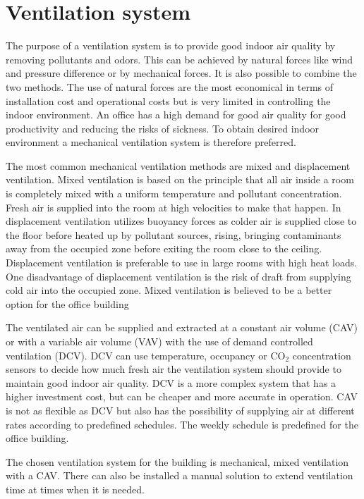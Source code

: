 \section{Ventilation system}
The purpose of a ventilation system is to provide good indoor air quality by removing pollutants and odors. This can be achieved by natural forces like wind and pressure difference or by mechanical forces. It is also possible to combine the two methods. The use of natural forces are the most economical in terms of installation cost and operational costs but is very limited in controlling the indoor environment. An office has a high demand for good air quality for good productivity and reducing the risks of sickness. To obtain desired indoor environment a mechanical ventilation system is therefore preferred.

The most common mechanical ventilation methods are mixed and displacement ventilation. Mixed ventilation is based on the principle that all air inside a room is completely mixed with a uniform temperature and pollutant concentration. Fresh air is supplied into the room at high velocities to make that happen. In displacement ventilation utilizes buoyancy forces as colder air is supplied close to the floor before heated up by pollutant sources, rising, bringing contaminants away from the occupied zone before exiting the room close to the ceiling. Displacement ventilation is preferable to use in large rooms with high heat loads. One disadvantage of displacement ventilation is the risk of draft from supplying cold air into the occupied zone. Mixed ventilation is believed to be a better option for the office building

The ventilated air can be supplied and extracted at a constant air volume (\ac{CAV}) or with a variable air volume (\ac{VAV}) with the use of demand controlled ventilation (\ac{DCV}). DCV can use temperature, occupancy or CO$_2$ concentration sensors to decide how much fresh air the ventilation system should provide to maintain good indoor air quality. DCV is a more complex system that has a higher investment cost, but can be cheaper and more accurate in operation. CAV is not as flexible as DCV but also has the possibility of supplying air at different rates according to predefined schedules. The weekly schedule is predefined for the office building.

The chosen ventilation system for the building is mechanical, mixed ventilation with a CAV. There can also be installed a manual solution to extend ventilation time at times when it is needed.

